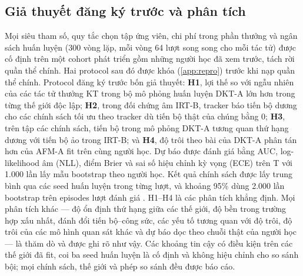 \subsection{Giả thuyết đăng ký trước và phân tích}\label{sec:protocol}

Mọi siêu tham số, quy tắc chọn tập ứng viên, chi phí trong phần thưởng và ngân sách huấn luyện (300 vòng lặp, mỗi vòng 64 lượt song song cho mỗi tác tử) được cố định trên một cohort phát triển gồm những người học đã xem trước, tách rời quần thể chính. Hai protocol sau đó được khóa (\ref{app:repro}) trước khi nạp quần thể chính. Protocol đăng ký trước bốn giả thuyết: \textbf{H1}, lợi thế so với ngẫu nhiên của các tác tử thưởng KT trong bộ mô phỏng huấn luyện DKT-A lớn hơn trong từng thế giới độc lập; \textbf{H2}, trong đối chứng âm IRT-B, tracker báo tiến bộ dương cho các chính sách tối ưu theo tracker dù tiến bộ thật của chúng bằng 0; \textbf{H3}, trên tập các chính sách, tiến bộ trong mô phỏng DKT-A tương quan thứ hạng dương với tiến bộ ảo trong IRT-B; và \textbf{H4}, độ trôi theo bài của DKT-A phân tán hơn của AFM-A fit trên cùng người học. Dự báo được đánh giá bằng AUC, log-likelihood âm (NLL), điểm Brier và sai số hiệu chỉnh kỳ vọng (ECE) trên T với 1.000 lần lấy mẫu bootstrap theo người học. Kết quả chính sách được lấy trung bình qua các seed huấn luyện trong từng lượt, và khoảng 95\% dùng 2.000 lần bootstrap trên {{episodes}} lượt đánh giá \citep{efron1993bootstrap}. H1--H4 là các phân tích khẳng định. Mọi phân tích khác — độ ổn định thứ hạng giữa các thế giới, độ bền trong trường hợp xấu nhất, đánh đổi tiến bộ--công sức, các yếu tố tương quan với độ trôi, độ trôi của các mô hình quan sát khác và dự báo dọc theo chuỗi thật của người học — là thăm dò và được ghi rõ như vậy. Các khoảng tin cậy có điều kiện trên các thế giới đã fit, coi ba seed huấn luyện là cố định và không hiệu chỉnh cho so sánh bội; mọi chính sách, thế giới và phép so sánh đều được báo cáo.
